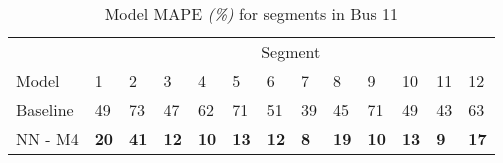 \begin{table}[H]
	\centering
	\caption{Model MAPE \textit{(\%)} for segments in Bus 11}
	\label{fig:model-mape-of-segs-211}
	\begin{adjustbox}{center}
	\begin{tabular}{ l | l | l | l | l | l | l | l | l | l | l | l | l}
		& \multicolumn{12}{c}{Segment} \\
		Model       & 1 & 2 & 3 & 4 & 5 & 6 & 7 & 8 & 9 & 10 & 11 & 12 \\
		\hline
		Baseline  & 49 & 73 & 47 & 62 & 71 & 51 & 39 & 45 & 71 & 49  & 43 & 63 \\
		NN - M4         & \textbf{20}& \textbf{41}& \textbf{12}& \textbf{10}& \textbf{13}& \textbf{12}& \textbf{8}& \textbf{19}& \textbf{10}& \textbf{13}& \textbf{9}& \textbf{17}\\
	\end{tabular}
	\end{adjustbox}
\end{table}





